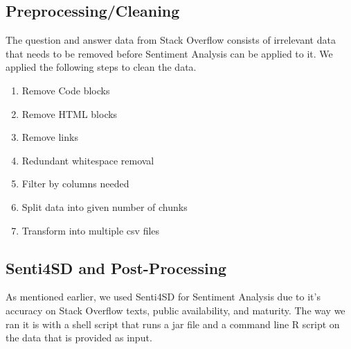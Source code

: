 \documentclass[conference]{IEEEtran}
\begin{document}
\subsection{Preprocessing/Cleaning}
The question and answer data from Stack Overflow consists of irrelevant data that needs to be removed before Sentiment Analysis can be applied to it. We applied the following steps to clean the data.

\begin{enumerate}
    \item Remove Code blocks
    \item Remove HTML blocks
    \item Remove links
    \item Redundant whitespace removal
    \item Filter by columns needed
    \item Split data into given number of chunks
    \item Transform into multiple csv files\\
\end{enumerate}

\subsection{Senti4SD and Post-Processing}
As mentioned earlier, we used Senti4SD for Sentiment Analysis due to it's accuracy on Stack Overflow texts, public availability, and maturity. The way we ran it is with a shell script that runs a jar file and a command line R script on the data that is provided as input.\\
\end{document}
